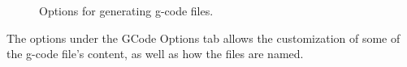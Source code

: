 \documentclass[11pt]{book}
\begin{document}
\begin{figure}
	\caption{Options for generating g-code files.}
	\label{fig:GCodeOptions}
\end{figure}

The options under the GCode Options tab allows the customization of some of the g-code file's content, as well as how the files are named.
\end{document}
